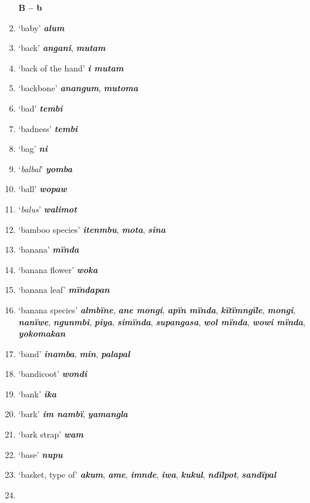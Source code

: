 \begin{enumerate}[noitemsep, label={}, align=left, widest=190, labelsep=1ex,leftmargin=*,itemindent=-10pt]
\noindent \textbf{B – b}\\ \item

‘baby’ \textbf{\textit{alum}} \item
‘back’ \textbf{\textit{angani}}, \textbf{\textit{mutam}} \item
‘back of the hand’ \textbf{\textit{i mutam}} \item
‘backbone’ \textbf{\textit{anangum}}, \textbf{\textit{mutoma}} \item
‘bad’ \textbf{\textit{tembi}} \item
‘badness’ \textbf{\textit{tembi}} \item
‘bag’ \textbf{\textit{ni}} \item
‘\textit{balbal}’ \textbf{\textit{yomba}} \item
‘ball’ \textbf{\textit{wopaw}} \item
‘\textit{balus}’ \textbf{\textit{walimot}} \item
‘bamboo species’ \textbf{\textit{itenmbu}}, \textbf{\textit{mota}}, \textbf{\textit{sina}} \item
‘banana’ \textbf{\textit{mïnda}} \item
‘banana flower’ \textbf{\textit{woka}} \item
‘banana leaf’ \textbf{\textit{mïndapan}} \item
‘banana species’ \textbf{\textit{almbïne}}, \textbf{\textit{ane mongi}}, \textbf{\textit{apïn mïnda}}, \textbf{\textit{kïtïmngïle}}, \textbf{\textit{mongi}}, \linebreak \textbf{\textit{nanïwe}}, \textbf{\textit{ngunmbi}}, \textbf{\textit{piya}}, \textbf{\textit{simïnda}}, \textbf{\textit{supangasa}}, \textbf{\textit{wol mïnda}}, \textbf{\textit{wowi mïnda}}, \linebreak \textbf{\textit{yokomakan}} \item
‘band’ \textbf{\textit{inamba}}, \textbf{\textit{min}}, \textbf{\textit{palapal}} \item
‘bandicoot’ \textbf{\textit{wondi}} \item
‘bank’ \textbf{\textit{ika}} \item
‘bark’ \textbf{\textit{im nambï}}, \textbf{\textit{yamangla}} \item
‘bark strap’ \textbf{\textit{wam}} \item
‘base’ \textbf{\textit{nupu}} \item
‘basket, type of’ \textbf{\textit{akum}}, \textbf{\textit{ame}}, \textbf{\textit{imnde}}, \textbf{\textit{iwa}}, \textbf{\textit{kukul}}, \textbf{\textit{ndïlpot}}, \textbf{\textit{sandïpal}} \item

\end{enumerate}
